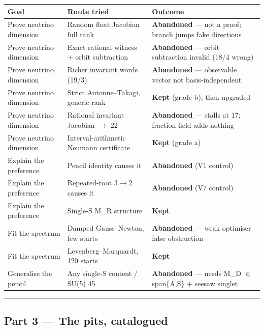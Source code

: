 \documentclass[11pt]{article}
\begin{document}
\begin{center}\footnotesize
\begin{tabular}{@{}p{}p{}p{}@{}}
\hline
Goal & Route tried & Outcome \\
\hline
Prove neutrino dimension & Random float Jacobian full rank & \textbf{Abandoned} --- not a proof; branch jumps fake directions \\
Prove neutrino dimension & Exact rational witness + orbit subtraction & \textbf{Abandoned} --- orbit subtraction invalid (18/4 wrong) \\
Prove neutrino dimension & Richer invariant words (19/3) & \textbf{Abandoned} --- observable vector not basis-independent \\
Prove neutrino dimension & Strict Autonne--Takagi, generic rank & \textbf{Kept} (grade b), then upgraded \\
Prove neutrino dimension & Rational invariant Jacobian $\rightarrow$ 22 & \textbf{Abandoned} --- stalls at 17; fraction field adds nothing \\
Prove neutrino dimension & Interval-arithmetic Neumann certificate & \textbf{Kept} (grade a) \\
Explain the preference & Pencil identity causes it & \textbf{Abandoned} (V1 control) \\
Explain the preference & Repeated-root 3$\rightarrow$2 causes it & \textbf{Abandoned} (V7 control) \\
Explain the preference & Single-S M\_R structure & \textbf{Kept} \\
Fit the spectrum & Damped Gauss--Newton, few starts & \textbf{Abandoned} --- weak optimiser false obstruction \\
Fit the spectrum & Levenberg--Marquardt, 120 starts & \textbf{Kept} \\
Generalise the pencil & Any single-S content / SU(5) 45 & \textbf{Abandoned} --- needs M\_D $\in$ span\{A,S\} + seesaw singlet \\
\hline
\end{tabular}\end{center}

\vspace{4pt}\hrule\vspace{4pt}

\subsection*{Part 3 --- The pits, catalogued}
\end{document}
